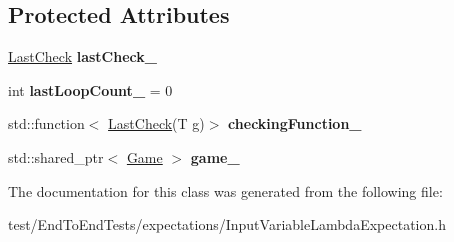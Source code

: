 \subsection*{Protected Attributes}
\begin{DoxyCompactItemize}
\item 
\hyperlink{structLastCheck}{Last\+Check} {\bfseries last\+Check\+\_\+}\hypertarget{classInputVariableLambdaExpectation_a3b3970913516b1dbe8f7690fb9118585}{}\label{classInputVariableLambdaExpectation_a3b3970913516b1dbe8f7690fb9118585}

\item 
int {\bfseries last\+Loop\+Count\+\_\+} = 0\hypertarget{classInputVariableLambdaExpectation_a0d392309dc10f154e5433d4c76720489}{}\label{classInputVariableLambdaExpectation_a0d392309dc10f154e5433d4c76720489}

\item 
std\+::function$<$ \hyperlink{structLastCheck}{Last\+Check}(T g)$>$ {\bfseries checking\+Function\+\_\+}\hypertarget{classInputVariableLambdaExpectation_ab1c1838fba8276a131b89504f806ef23}{}\label{classInputVariableLambdaExpectation_ab1c1838fba8276a131b89504f806ef23}

\item 
std\+::shared\+\_\+ptr$<$ \hyperlink{classGame}{Game} $>$ {\bfseries game\+\_\+}\hypertarget{classInputVariableLambdaExpectation_a63b9960859e07f6bd11baf622c098423}{}\label{classInputVariableLambdaExpectation_a63b9960859e07f6bd11baf622c098423}

\end{DoxyCompactItemize}


The documentation for this class was generated from the following file\+:\begin{DoxyCompactItemize}
\item 
test/\+End\+To\+End\+Tests/expectations/Input\+Variable\+Lambda\+Expectation.\+h\end{DoxyCompactItemize}
